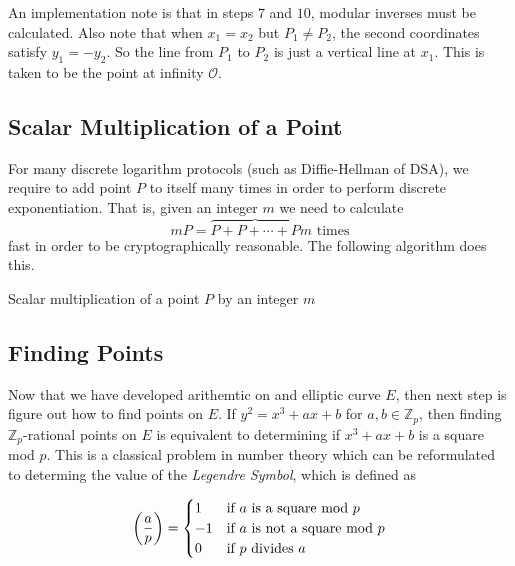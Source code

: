An implementation note is that in steps $7$ and $10$, modular inverses must be calculated. Also note that when $x_1 = x_2$ but $P_1 \neq P_2$, the second coordinates satisfy $y_1 = -y_2$. So the line from $P_1$ to $P_2$ is just a vertical line at $x_1$. This is taken to be the point at infinity $\mathcal{O}$.

\subsection{Scalar Multiplication of a Point}

For many discrete logarithm protocols (such as Diffie-Hellman of DSA), we require to add point $P$ to itself many times in order to perform discrete exponentiation. That is, given an integer $m$ we need to calculate $$mP = \overbrace{P + P + \cdots + P}{m \text{ times}}$$ fast in order to be cryptographically reasonable. The following algorithm does this.

\begin{algorithm} 
	\caption{Scalar multiplication of a point $P$ by an integer $m$}
	\begin{algorithmic}[1]
		  		\State {}
		  		\State {}
		  		\State {}
		  	\Else 
		  		\State {}
		  	\EndIf
	  	\EndFunction
	\end{algorithmic} 
\end{algorithm} 

\subsection{Finding Points}

Now that we have developed arithemtic on and elliptic curve $E$, then next step is figure out how to find points on $E$. If $y^2 = x^3 + ax + b$ for $a,b \in \mathbb{Z}_p$, then finding $\mathbb{Z}_p$-rational points on $E$ is equivalent to determining if $x^3 + ax + b$ is a square mod $p$. This is a classical problem in number theory which can be reformulated to determing the value of the \textit{Legendre Symbol}, which is defined as 

$$ \left(\frac{a}{p}\right) =
\begin{cases}
1 &\text{if }a \text{ is a square mod } p\\
-1 &\text{if }a \text{ is not a square mod }p\\
0 & \text{if } p \text{ divides }a
\end{cases} 
$$ 

